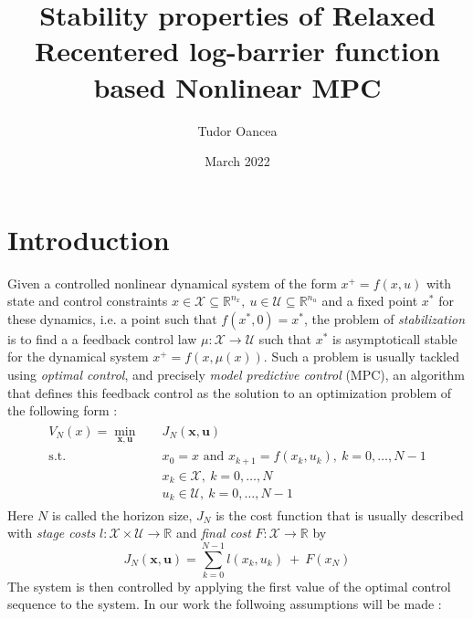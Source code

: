 \documentclass[12pt]{article}
\title{Stability properties of Relaxed Recentered log-barrier function based Nonlinear MPC}
\author{Tudor Oancea}
\date{March 2022}
\theoremstyle{definition}
\theoremstyle{remark}
\def\cal#1{\mathcal{#1}}
\newcommand{\R}{\mathbb{R}}
\begin{document}
\maketitle

\section{Introduction}
Given a controlled nonlinear dynamical system of the form $x^+=f(x,u)$ with state and control constraints $x\in\cal{X}\subseteq\R^{n_x},~u\in\cal{U}\subseteq\R^{n_u}$ and a fixed point $x^*$ for these dynamics, i.e. a point such that $f(x^*,0)=x^*$, the problem of \textit{stabilization} is to find a a feedback control law $\mu:\cal{X}\to\cal{U}$ such that $x^*$ is asymptoticall stable for the dynamical system $x^+=f(x,\mu(x))$.
Such a problem is usually tackled using \textit{optimal control}, and precisely \textit{model predictive control} (MPC), an algorithm that defines this feedback control as the solution to an optimization problem of the following form :
\begin{align}
	\begin{split}
		\label{NMPC}
		V_N(x)=\underset{\mathbf{x},\mathbf{u}}{\min} &\quad J_N(\mathbf{x},\mathbf{u})\\
		\text{s.t.} &\quad x_0=x\text{ and }x_{k+1}=f(x_k,u_k),~k=0,\dots,N-1\\
		&\quad x_k\in\cal{X},~k=0,\dots,N\\
		&\quad u_k\in\cal{U},~k=0,\dots,N-1
	\end{split}
\end{align}
Here $N$ is called the horizon size, $J_N$ is the cost function that is usually described with \textit{stage costs} $l:\cal{X}\times\cal{U}\to\R$ and \textit{final cost} $F:\cal{X}\to\R$ by 
$$J_N(\mathbf{x},\mathbf{u})=\sum_{k=0}^{N-1}l(x_k,u_k)~+~F(x_N)$$
The system is then controlled by applying the first value of the optimal control sequence to the system.\newline
In our work the follwoing assumptions will be made :
\end{document}
